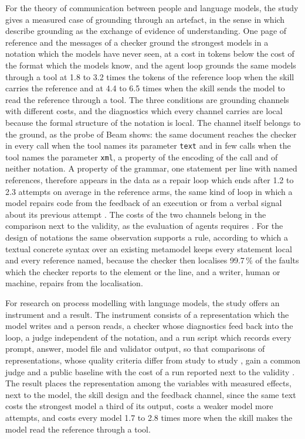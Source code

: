\documentclass[11pt,a4paper]{article}
\begin{document}
For the theory of communication between people and language models, the study gives a measured case of grounding through an artefact, in the sense in which \citet{ClarkBrennan1991} describe grounding as the exchange of evidence of understanding. One page of reference and the messages of a checker ground the strongest models in a notation which the models have never seen, at a cost in tokens below the cost of the format which the models know, and the agent loop grounds the same models through a tool at 1.8 to 3.2 times the tokens of the reference loop when the skill carries the reference and at 4.4 to 6.5 times when the skill sends the model to read the reference through a tool. The three conditions are grounding channels with different costs, and the diagnostics which every channel carries are local because the formal structure of the notation is local. The channel itself belongs to the ground, as the probe of Beam shows: the same document reaches the checker in every call when the tool names its parameter \texttt{text} and in few calls when the tool names the parameter \texttt{xml}, a property of the encoding of the call and of neither notation. A property of the grammar, one statement per line with named references, therefore appears in the data as a repair loop which ends after 1.2 to 2.3 attempts on average in the reference arms, the same kind of loop in which a model repairs code from the feedback of an execution \citep{Chen2024selfdebug} or from a verbal signal about its previous attempt \citep{Madaan2023selfrefine,Shinn2023reflexion}. The costs of the two channels belong in the comparison next to the validity, as the evaluation of agents requires \citep{Kapoor2025agents}. For the design of notations the same observation supports a rule, according to which a textual concrete syntax over an existing metamodel keeps every statement local and every reference named, because the checker then localises 99.7\,\% of the faults which the checker reports to the element or the line, and a writer, human or machine, repairs from the localisation.

For research on process modelling with language models, the study offers an instrument and a result. The instrument consists of a representation which the model writes and a person reads, a checker whose diagnostics feed back into the loop, a judge independent of the notation, and a run script which records every prompt, answer, model file and validator output, so that comparisons of representations, whose quality criteria differ from study to study \citep{Brissard2026representation,Agrawal2026bpcf,Lauer2026competences}, gain a common judge and a public baseline with the cost of a run reported next to the validity \citep{Kapoor2025agents}. The result places the representation among the variables with measured effects, next to the model, the skill design and the feedback channel, since the same text costs the strongest model a third of its output, costs a weaker model more attempts, and costs every model 1.7 to 2.8 times more when the skill makes the model read the reference through a tool.
\end{document}
